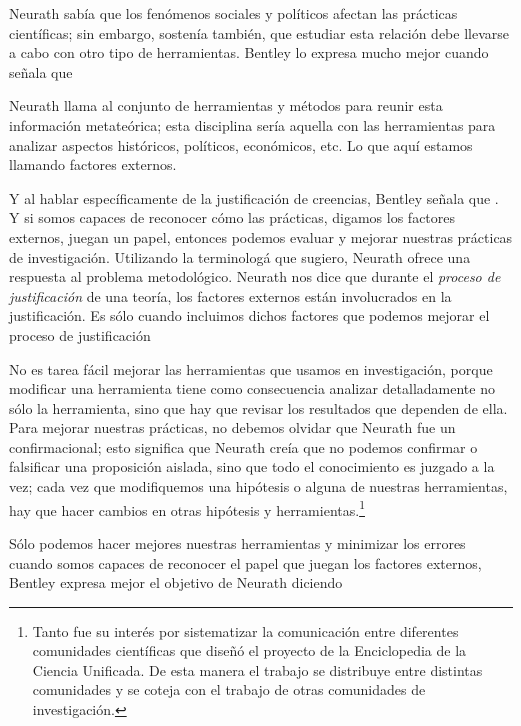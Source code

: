 Neurath sabía que los fenómenos sociales y políticos afectan las prácticas científicas; sin embargo, sostenía también, que estudiar esta relación debe llevarse a cabo con otro tipo de herramientas.
Bentley lo expresa mucho mejor cuando señala que  
\parencite[p.~62]{Bentley2023}

Neurath llama  al conjunto de herramientas y métodos para reunir esta información metateórica; 
esta disciplina sería aquella con las herramientas para analizar aspectos históricos, políticos, económicos, etc.
Lo que aquí estamos llamando factores externos.

Y al hablar específicamente de la justificación de creencias, Bentley señala que  \parencite[p.~41]{Bentley2023}.
Y si somos capaces de reconocer cómo las prácticas, digamos los factores externos,  juegan un papel, entonces podemos evaluar y mejorar nuestras prácticas de investigación.
Utilizando la terminologá que sugiero, Neurath ofrece una respuesta al
problema metodológico. Neurath nos dice que durante el \emph{proceso de
justificación} de una teoría, los factores externos están involucrados en
la justificación. Es sólo cuando incluimos dichos factores que podemos
mejorar el proceso de justificación

No es tarea fácil mejorar las herramientas que usamos en investigación, porque modificar una herramienta tiene como consecuencia analizar detalladamente no sólo la herramienta, sino que hay que revisar los resultados que dependen de ella.
Para mejorar nuestras prácticas, no debemos olvidar que Neurath fue un  confirmacional; esto significa que Neurath creía que no podemos confirmar o falsificar una proposición aislada, sino que todo el conocimiento es juzgado a la vez; 
cada vez que modifiquemos una hipótesis o alguna de nuestras herramientas, hay que hacer cambios en otras hipótesis y herramientas.\footnote{
	Tanto fue su interés por sistematizar la comunicación entre diferentes comunidades científicas que diseñó el proyecto de la Enciclopedia de la  Ciencia Unificada.
	De esta manera el trabajo se distribuye entre distintas comunidades y se coteja con el trabajo de otras comunidades de investigación.
	}

Sólo podemos hacer mejores nuestras herramientas y minimizar los errores cuando somos capaces de reconocer el papel que juegan los factores externos, Bentley expresa mejor el objetivo de Neurath diciendo  \parencite[p.~41]{Bentley2023}

